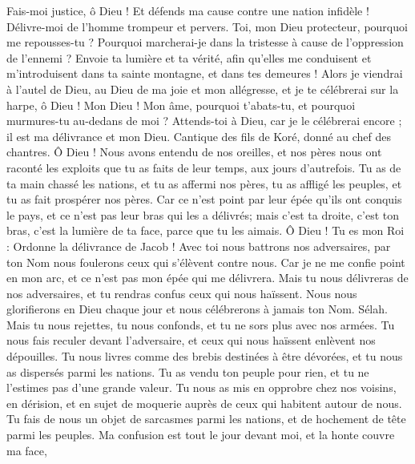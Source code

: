 \begin{multicols}{2}
\VerseOne{}Fais-moi justice, ô Dieu ! Et défends ma cause contre une nation infidèle ! Délivre-moi de l'homme trompeur et pervers.
Toi, mon Dieu protecteur, pourquoi me repousses-tu ? Pourquoi marcherai-je dans la tristesse à cause de l'oppression de l'ennemi ?
Envoie ta lumière et ta vérité, afin qu'elles me conduisent et m'introduisent dans ta sainte montagne, et dans tes demeures !
Alors je viendrai à l'autel de Dieu, au Dieu de ma joie et mon allégresse, et je te célébrerai sur la harpe, ô Dieu ! Mon Dieu !
Mon âme, pourquoi t'abats-tu, et pourquoi murmures-tu au-dedans de moi ? Attends-toi à Dieu, car je le célébrerai encore ; il est ma délivrance et mon Dieu.
\VerseOne{}Cantique des fils de Koré, donné au chef des chantres.
Ô Dieu ! Nous avons entendu de nos oreilles, et nos pères nous ont raconté les exploits que tu as faits de leur temps, aux jours d'autrefois.
Tu as de ta main chassé les nations, et tu as affermi nos pères, tu as affligé les peuples, et tu as fait prospérer nos pères.
Car ce n'est point par leur épée qu'ils ont conquis le pays, et ce n'est pas leur bras qui les a délivrés; mais c'est ta droite, c'est ton bras, c'est la lumière de ta face, parce que tu les aimais.
Ô Dieu ! Tu es mon Roi : Ordonne la délivrance de Jacob !
Avec toi nous battrons nos adversaires, par ton Nom nous foulerons ceux qui s'élèvent contre nous.
Car je ne me confie point en mon arc, et ce n'est pas mon épée qui me délivrera.
Mais tu nous délivreras de nos adversaires, et tu rendras confus ceux qui nous haïssent.
Nous nous glorifierons en Dieu chaque jour et nous célébrerons à jamais ton Nom. Sélah.
Mais tu nous rejettes, tu nous confonds, et tu ne sors plus avec nos armées.
Tu nous fais reculer devant l'adversaire, et ceux qui nous haïssent enlèvent nos dépouilles.
Tu nous livres comme des brebis destinées à être dévorées, et tu nous as dispersés parmi les nations.
Tu as vendu ton peuple pour rien, et tu ne l'estimes pas d'une grande valeur.
Tu nous as mis en opprobre chez nos voisins, en dérision, et en sujet de moquerie auprès de ceux qui habitent autour de nous.
Tu fais de nous un objet de sarcasmes parmi les nations, et de hochement de tête parmi les peuples.
Ma confusion est tout le jour devant moi, et la honte couvre ma face,

\end{multicols}
